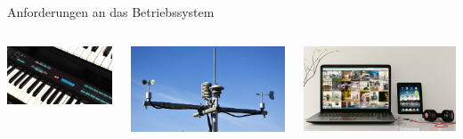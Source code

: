 {\begin{frame}{Anforderungen an das Betriebssystem}
    \vfill

    \begin{columns}[T]
        \includegraphics[width=\textwidth]{8-linux/img/os-embedded}

        \includegraphics[width=\textwidth]{8-linux/img/os-iot}

        \includegraphics[width=\textwidth]{8-linux/img/os-workstation}
    \end{columns}
\end{frame}
}

